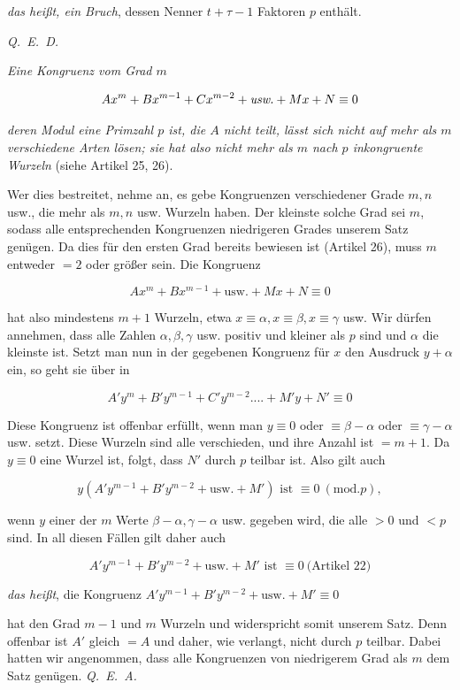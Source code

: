 \noindent\emph{das heißt, ein Bruch}, dessen Nenner $t+\tau-1$ Faktoren $p$ enthält.\par
\noindent\mbox{\emph{Q. E. D.}}



\emph{Eine Kongruenz vom Grad $m$}

\[Ax^m+Bx^{m-1}+Cx^{m-2}+\emph{usw.}+Mx+N\equiv0\]

\noindent\emph{deren Modul eine Primzahl $p$ ist, die $A$ nicht teilt, lässt sich nicht auf mehr als $m$ verschiedene Arten lösen; sie hat also nicht mehr als $m$ nach $p$ inkongruente Wurzeln} (siehe Artikel 25, 26).

Wer dies bestreitet, nehme an, es gebe Kongruenzen verschiedener Grade $m,n$ usw., die mehr als $m,n$ usw. Wurzeln haben. Der kleinste solche Grad sei $m$, sodass alle entsprechenden Kongruenzen niedrigeren Grades unserem Satz genügen. Da dies für den ersten Grad bereits bewiesen ist (Artikel 26), muss $m$ entweder $=2$ oder größer sein. Die Kongruenz

\[Ax^m+Bx^{m-1}+\text{usw.}+Mx+N\equiv0\]

\noindent hat also mindestens $m+1$ Wurzeln, etwa $x\equiv\alpha,x\equiv\beta,x\equiv\gamma$ usw. Wir dürfen annehmen, dass alle Zahlen $\alpha,\beta,\gamma$ usw. positiv und kleiner als $p$ sind und $\alpha$ die kleinste ist. Setzt man nun in der gegebenen Kongruenz für $x$ den Ausdruck $y+\alpha$ ein, so geht sie über in

\[A'y^m+B'y^{m-1}+C'y^{m-2}....+M'y+N'\equiv0\]

Diese Kongruenz ist offenbar erfüllt, wenn man $y\equiv0$ oder $\equiv\beta-\alpha$ oder $\equiv\gamma-\alpha$ usw. setzt. Diese Wurzeln sind alle verschieden, und ihre Anzahl ist $=m+1$. Da $y\equiv0$ eine Wurzel ist, folgt, dass $N'$ durch $p$ teilbar ist. Also gilt auch

\[y(A'y^{m-1}+B'y^{m-2}+\text{usw.}+M')\text{ ist }\equiv0\ (\mathrm{mod.}p),\]

\noindent wenn $y$ einer der $m$ Werte $\beta-\alpha,\gamma-\alpha$ usw. gegeben wird, die alle $>0$ und $<p$ sind. In all diesen Fällen gilt daher auch

\[A'y^{m-1}+B'y^{m-2}+\text{usw.}+M'\text{ ist }\equiv0\ \text{(Artikel 22)}\]

\noindent\emph{das heißt}, die Kongruenz \qquad $A'y^{m-1}+B'y^{m-2}+\text{usw.}+M'\equiv0$

\noindent hat den Grad $m-1$ und $m$ Wurzeln und widerspricht somit unserem Satz. Denn offenbar ist $A'$ gleich $=A$ und daher, wie verlangt, nicht durch $p$ teilbar. Dabei hatten wir angenommen, dass alle Kongruenzen von niedrigerem Grad als $m$ dem Satz genügen. \mbox{\emph{Q. E. A.}}

